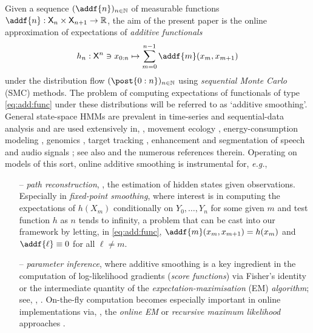 Given a sequence $(\addf{n})_{n \in \nset}$ of measurable functions $\addf{n} : \Xset_n \times \Xset_{n + 1} \to \rset$, the aim of the present paper is the online approximation of expectations of \emph{additive functionals}   
\begin{equation} \label{eq:add:func}
    h_n : \Xset^n \ni x_{0:n} \mapsto \sum_{m = 0}^{n - 1} \addf{m}(x_m, x_{m + 1})
\end{equation}
under the distribution flow $(\post{0:n})_{n \in \nset}$ using \emph{sequential Monte Carlo} (SMC) methods.  The problem of computing expectations of functionals of type \eqref{eq:add:func} under these distributions will be referred to as `additive smoothing'. General state-space HMMs are prevalent in time-series and sequential-data analysis and are used extensively in, \eg, movement ecology \cite{michelot2016movehmm}, energy-consumption modeling \cite{candanedo2017methodology}, genomics \cite{yau2011bayesian}, target tracking \cite{sarkka2007rao}, enhancement and segmentation of speech and audio signals \cite{rabiner1989tutorial}; see also \cite{sarkka2013bayesian, zucchini2017hidden} and the numerous references therein. Operating on models of this sort, online additive smoothing is instrumental for, \emph{e.g.},    
\begin{enumerate}
    \item[--] \emph{path reconstruction}, \ie, the estimation of hidden states given observations. Especially in \emph{fixed-point smoothing}, where interest is in computing the expectations of $h(X_m)$ conditionally on $Y_0, \ldots, Y_n$ for some given $m$ and test function $h$ as $n$ tends to infinity, a problem that can be cast into our framework by letting, in \eqref{eq:add:func}, $\addf{m}(x_m, x_{m + 1}) = h(x_m)$ and $\addf{\ell} \equiv 0$ for all $\ell \neq m$. 
    \item[--] \emph{parameter inference}, where additive smoothing is a key ingredient in the computation of log-likelihood gradients (\emph{score functions}) via Fisher's identity or the intermediate quantity of the \emph{expectation-maximisation} (EM) \emph{algorithm}; see, \eg, \cite[Chapter~10]{Cappe:2005:IHM:1088883}. On-the-fly computation becomes especially important in online implementations via, \eg, the \emph{online EM} or \emph{recursive maximum likelihood} approaches \cite{cappe:2009,legland:mevel:1997}.  
 \end{enumerate}

